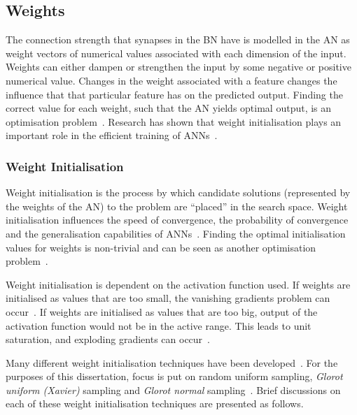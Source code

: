 \subsection{Weights}\label{sec:anns:an:weights}

The connection strength that synapses in the \acs{BN} have is modelled in the \acs{AN} as weight vectors of numerical values associated with each dimension of the input. Weights can either dampen or strengthen the input by some negative or positive numerical value. Changes in the weight associated with a feature changes the influence that that particular feature has on the predicted output. Finding the correct value for each weight, such that the \acs{AN} yields optimal output, is an optimisation problem~\cite{ref:thierens:1993}. Research has shown that weight initialisation plays an important role in the efficient training of \acp{ANN}~\cite{ref:thimm:1995}.

\subsubsection{Weight Initialisation}\label{sec:anns:an:weights:initialisation}

Weight initialisation is the process by which candidate solutions (represented by the weights of the \acs{AN}) to the problem are ``placed'' in the search space. Weight initialisation influences the speed of convergence, the probability of convergence and the generalisation capabilities of \acp{ANN}~\cite{ref:fernandez:2001}. Finding the optimal initialisation values for weights is non-trivial and can be seen as another optimisation problem~\cite{ref:de:2016, ref:erdogmus:2003, ref:yam:2000}.

Weight initialisation is dependent on the activation function used. If weights are initialised as values that are too small, the vanishing gradients problem can occur~\cite{ref:hanin:2018}. If weights are initialised as values that are too big, output of the activation function would not be in the active range. This leads to unit saturation, and exploding gradients can occur~\cite{ref:hanin:2018}.

Many different weight initialisation techniques have been developed~\cite{ref:erdogmus:2003}. For the purposes of this dissertation, focus is put on random uniform sampling, \textit{Glorot uniform (Xavier)} sampling and \textit{Glorot normal} sampling~\cite{ref:glorot:2010}. Brief discussions on each of these weight initialisation techniques are presented as follows.


